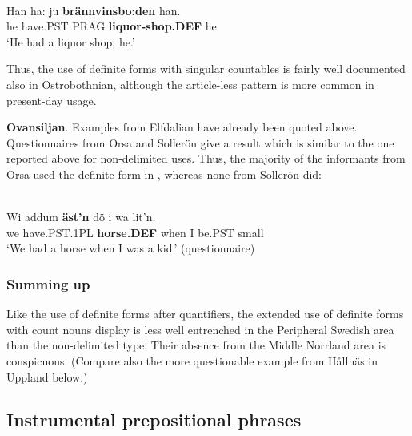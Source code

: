 \ea \label{} 
\\
\gll Han  ha:  ju  \textbf{brännvinsbo:den} han.  \\
he  have.PST  PRAG  \textbf{liquor-shop.DEF} he  \\
\glt ‘He had a liquor shop, he.’ 

\z

Thus, the use of definite forms with singular countables is fairly well documented also in Ostrobothnian, although the article-less pattern is more common in present-day usage.

\textbf{Ovansiljan}. Examples from Elfdalian have already been quoted above. Questionnaires from Orsa and Sollerön give a result which is similar to the one reported above for non-delimited uses. Thus, the majority of the informants from Orsa used the definite form in , whereas none from Sollerön did:

\ea \label{} 
\\
\gll Wi  addum  \textbf{äst’n} dö  i  wa  lit’n.\\
we  have.PST.1PL  \textbf{horse.DEF} when  I   be.PST  small\\
\glt ‘We had a horse when I was a kid.’ (questionnaire)

\z

\subsubsection{Summing up}
 Like the use of definite forms after quantifiers, the extended use of definite forms with count nouns display is less well entrenched in the Peripheral Swedish area than the non-delimited type. Their absence from the Middle Norrland area is conspicuous. (Compare also the more questionable example  from Hållnäs in Uppland below.)

\subsection{ Instrumental prepositional phrases }

